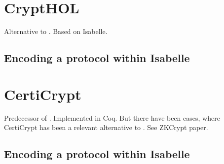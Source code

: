 \chapter{CryptHOL}
\label{ch:crypthol}
Alternative to \easycrypt. Based on Isabelle.

\section{Encoding a protocol within Isabelle}
\label{sec:protocol_in_isabelle}


\chapter{CertiCrypt}
\label{ch:certicrypt}
Predecessor of \easycrypt. Implemented in Coq. But there have been cases, where CertiCrypt has been
a relevant alternative to \easycrypt. See ZKCrypt paper.

\section{Encoding a protocol within Isabelle}
\label{sec:protocol_in_certicrypt}


